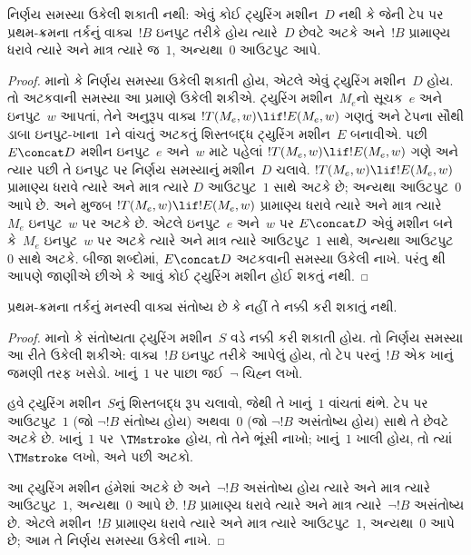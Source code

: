\begin{thm}
નિર્ણય સમસ્યા ઉકેલી શકાતી નથી: એવું કોઈ ટ્યુરિંગ
મશીન~$D$ નથી કે જેની ટેપ પર પ્રથમ-ક્રમના તર્કનું
વાક્ય~$!B$ ઇનપુટ તરીકે હોય ત્યારે~$D$ છેવટે
અટકે અને~$!B$ પ્રામાણ્ય ધરાવે ત્યારે અને માત્ર ત્યારે
જ~$1$, અન્યથા~$0$ આઉટપુટ આપે.
\end{thm}

\begin{proof}
માનો કે નિર્ણય સમસ્યા ઉકેલી શકાતી હોય, એટલે એવું
ટ્યુરિંગ મશીન~$D$ હોય. તો અટકવાની સમસ્યા આ પ્રમાણે
ઉકેલી શકીએ. ટ્યુરિંગ મશીન~$M_e$નો સૂચક~$e$ અને
ઇનપુટ~$w$ આપતાં, તેને અનુરૂપ વાક્ય
$!T(M_e, w) \lif !E(M_e, w)$ ગણતું અને ટેપના સૌથી
ડાબા ઇનપુટ-ખાના~$1$ને વાંચતું અટકતું શિસ્તબદ્ધ
ટ્યુરિંગ મશીન~$E$ બનાવીએ.
પછી $E \concat D$ મશીન ઇનપુટ~$e$ અને~$w$ માટે
પહેલાં $!T(M_e, w) \lif !E(M_e, w)$ ગણે અને ત્યાર પછી
તે ઇનપુટ પર નિર્ણય સમસ્યાનું મશીન~$D$ ચલાવે.
$!T(M_e, w) \lif !E(M_e, w)$ પ્રામાણ્ય ધરાવે ત્યારે
અને માત્ર ત્યારે $D$ આઉટપુટ~$1$ સાથે અટકે છે;
અન્યથા આઉટપુટ~$0$ આપે છે.
 અને
 મુજબ
$!T(M_e, w) \lif !E(M_e, w)$ પ્રામાણ્ય
ધરાવે ત્યારે અને માત્ર ત્યારે~$M_e$ ઇનપુટ~$w$ પર
અટકે છે. એટલે ઇનપુટ~$e$ અને~$w$ પર $E\concat D$
એવું મશીન બને કે~$M_e$ ઇનપુટ~$w$ પર અટકે ત્યારે
અને માત્ર ત્યારે આઉટપુટ~$1$ સાથે, અન્યથા આઉટપુટ~$0$
સાથે અટકે. બીજા શબ્દોમાં, $E \concat D$ અટકવાની
સમસ્યા ઉકેલી નાખે. પરંતુ
થી આપણે જાણીએ છીએ
કે આવું કોઈ ટ્યુરિંગ મશીન હોઈ શકતું નથી.
\end{proof}

\begin{cor}%
પ્રથમ-ક્રમના તર્કનું મનસ્વી વાક્ય સંતોષ્ય છે કે
નહીં તે નક્કી કરી શકાતું નથી.
\end{cor}

\begin{proof}
  માનો કે સંતોષ્યતા ટ્યુરિંગ મશીન~$S$ વડે નક્કી કરી
  શકાતી હોય. તો નિર્ણય સમસ્યા આ રીતે ઉકેલી શકીએ:
  વાક્ય~$!B$ ઇનપુટ તરીકે આપેલું હોય, તો
  ટેપ પરનું~$!B$ એક ખાનું જમણી તરફ ખસેડો.
  ખાનું~$1$ પર પાછા જઈ~$\lnot$ ચિહ્ન લખો.

  હવે ટ્યુરિંગ મશીન~$S$નું શિસ્તબદ્ધ રૂપ ચલાવો,
  જેથી તે ખાનું~$1$ વાંચતાં થંભે. ટેપ પર આઉટપુટ~$1$
  (જો $\lnot !B$ સંતોષ્ય હોય) અથવા~$0$ (જો
  $\lnot !B$ અસંતોષ્ય હોય) સાથે તે છેવટે અટકે છે.
  ખાનું~$1$ પર~$\TMstroke$ હોય, તો તેને ભૂંસી નાખો;
  ખાનું~$1$ ખાલી હોય, તો ત્યાં~$\TMstroke$ લખો,
  અને પછી અટકો.

  આ ટ્યુરિંગ મશીન હંમેશાં અટકે છે અને~$\lnot !B$
  અસંતોષ્ય હોય ત્યારે અને માત્ર ત્યારે આઉટપુટ~$1$,
  અન્યથા~$0$ આપે છે. $!B$ પ્રામાણ્ય ધરાવે ત્યારે
  અને માત્ર ત્યારે~$\lnot !B$ અસંતોષ્ય છે. એટલે
  મશીન~$!B$ પ્રામાણ્ય ધરાવે ત્યારે અને માત્ર ત્યારે
  આઉટપુટ~$1$, અન્યથા~$0$ આપે છે; આમ તે નિર્ણય
  સમસ્યા ઉકેલી નાખે.
\end{proof}


